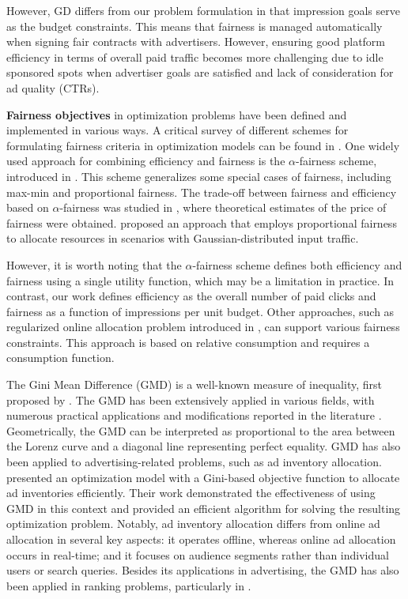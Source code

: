 However, GD differs from our problem formulation in that impression goals serve as the budget constraints. This means that fairness is managed automatically when signing fair contracts with advertisers. However, ensuring good platform efficiency in terms of overall paid traffic becomes more challenging due to idle sponsored spots when advertiser goals are satisfied and lack of consideration for ad quality (CTRs).

\textbf{Fairness objectives} in optimization problems have been defined and implemented in various ways. A critical survey of different schemes for formulating fairness criteria in optimization models can be found in \cite{XinyingChen2023}. One widely used approach for combining efficiency and fairness is the $\alpha$-fairness scheme, introduced in \cite{Atkinson1970}. This scheme generalizes some special cases of fairness, including max-min and proportional fairness. The trade-off between fairness and efficiency based on $\alpha$-fairness was studied in \cite{Bertsimas2012}, where theoretical estimates of the price of fairness were obtained. \cite{Bateni2022} proposed an approach that employs proportional fairness to allocate resources in scenarios with Gaussian-distributed input traffic.

However, it is worth noting that the $\alpha$-fairness scheme defines both efficiency and fairness using a single utility function, which may be a limitation in practice. In contrast, our work defines efficiency as the overall number of paid clicks and fairness as a function of impressions per unit budget. Other approaches, such as regularized online allocation problem introduced in \cite{Balseiro2021}, can support various fairness constraints. This approach is based on relative consumption and requires a consumption function.

The Gini Mean Difference (GMD) is a well-known measure of inequality, first proposed by \cite{gini1912}. The GMD has been extensively applied in various fields, with numerous practical applications and modifications reported in the literature \cite{Yitzhaki2012}. Geometrically, the GMD can be interpreted as proportional to the area between the Lorenz curve and a diagonal line representing perfect equality. GMD has also been applied to advertising-related problems, such as ad inventory allocation. \cite{Lejeune2019} presented an optimization model with a Gini-based objective function to allocate ad inventories efficiently. Their work demonstrated the effectiveness of using GMD in this context and provided an efficient algorithm for solving the resulting optimization problem. Notably, ad inventory allocation differs from online ad allocation in several key aspects: it operates offline, whereas online ad allocation occurs in real-time; and it focuses on audience segments rather than individual users or search queries. Besides its applications in advertising, the GMD has also been applied in ranking problems, particularly in \cite{do2021two, do2022optimizing}.

